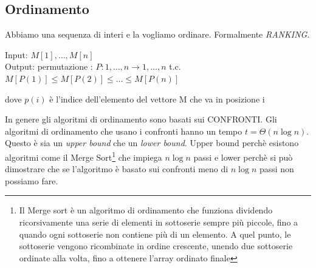
\newpage


\subsection{Ordinamento}
Abbiamo una sequenza di interi e la vogliamo ordinare. Formalmente \textit{RANKING}. 

Input: $M[1], \dots , M[n]$\\
Output: permutazione : $P:{1, \dots, n} \rightarrow {1, \dots , n}$ t.c. $M[P(1)] \leq M[P(2)] \leq \dots \leq M[P(n)]$

dove $p(i)$ è l'indice dell'elemento del vettore M che va in posizione i 

\begin{osservazione}
    In genere gli algoritmi di ordinamento sono basati sui CONFRONTI. Gli algoritmi di ordinamento che usano i confronti hanno un tempo $t = \Theta (n \log n)$. Questo è sia un \textit{upper bound} che un \textit{lower bound}. Upper bound perchè esistono algoritmi come il Merge Sort\footnote{Il Merge sort è un algoritmo di ordinamento che funziona dividendo ricorsivamente una serie di elementi in sottoserie sempre più piccole, fino a quando ogni sottoserie non contiene più di un elemento. A quel punto, le sottoserie vengono ricombinate in ordine crescente, unendo due sottoserie ordinate alla volta, fino a ottenere l'array ordinato finale} che impiega $n \log n$ passi e lower perchè si può dimostrare che se l'algoritmo è basato sui confronti meno di $n \log n$ passi non possiamo fare.
\end{osservazione}

